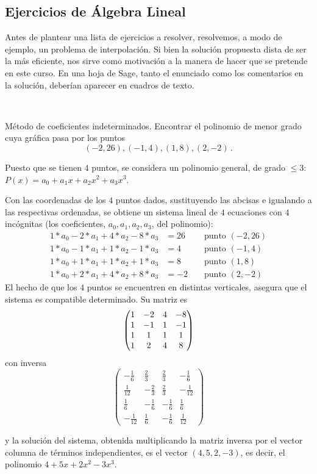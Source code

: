 \subsection{Ejercicios de Álgebra Lineal}\label{interp1}

Antes de plantear una lista de ejercicios a resolver, resolvemos, a modo de
ejemplo, un problema de interpolación. Si bien la solución propuesta dista de
ser la más eficiente,
nos sirve como motivación a la manera de hacer que se pretende en este curso. En
una hoja
de Sage, tanto el enunciado como los comentarios en la solución, deberían
aparecer en
cuadros de texto.

\

\begin{ejer}\label{coef-indet} {\upshape Método de coeficientes indeterminados}.
 Encontrar el polinomio de menor grado cuya gráfica pasa por los puntos
 $$
 (-2, 26), (-1, 4), (1, 8), (2, -2)\,.
 $$ 
\end{ejer}


\begin{sol}
 {Puesto que se tienen $4$ puntos, se considera un polinomio general, de grado
$\le 3$: $P(x)=a_0+a_1x+a_2x^2+a_3x^3$.

Con las coordenadas de los $4$ puntos dados, sustituyendo las abcisas e
igualando a las respectivas ordenadas, se obtiene un sistema lineal de $4$
ecuaciones con $4$ incógnitas (los coeficientes, $a_0,a_1,a_2,a_3$, del
polinomio): 
\begin{align*}
1*a_0-2*a_1+4*a_2-8*a_3&=26&&\text{ punto }(-2,26)\\
1*a_0-1*a_1+1*a_2-1*a_3&=4&&\text{ punto }(-1,4)\\
1*a_0+1*a_1+1*a_2+1*a_3&=8&&\text{ punto }(1,8)\\
1*a_0+2*a_1+4*a_2+8*a_3&=-2&&\text{ punto }(2,-2)
\end{align*}
El hecho de que
los $4$ puntos se encuentren en distintas verticales, asegura que el sistema es
compatible determinado. Su matriz  es 
\begin{equation}\notag
 \begin{pmatrix}
  1&-2&4&-8\\
  1&-1&1&-1\\
  1&1&1&1\\
  1&2&4&8
  \end{pmatrix}
\end{equation}
\noindent con inversa 
\[
\left(\begin{array}{rrrr}
-\frac{1}{6} & \frac{2}{3} & \frac{2}{3} & -\frac{1}{6} \\
\frac{1}{12} & -\frac{2}{3} & \frac{2}{3} & -\frac{1}{12} \\
\frac{1}{6} & -\frac{1}{6} & -\frac{1}{6} & \frac{1}{6} \\
-\frac{1}{12} & \frac{1}{6} & -\frac{1}{6} & \frac{1}{12}
\end{array}\right)
\]

\noindent y la soluci\'on del sistema, obtenida multiplicando la matriz inversa
por el vector columna de t\'erminos independientes,  es el vector $(4,5,2,-3)$,
es decir, el polinomio $4+5x+2x^2-3x^3.$}
\end{sol}

